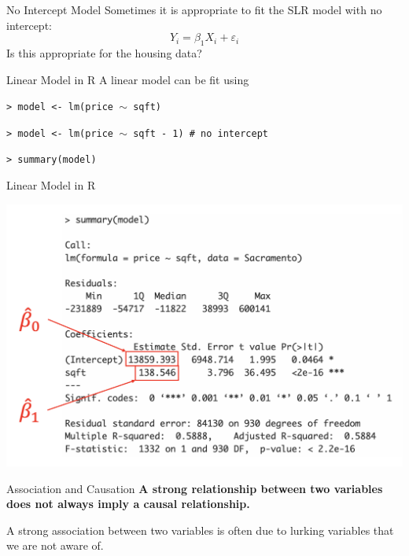 \documentclass[handout]{beamer}
\begin{document}
\begin{frame}{No Intercept Model}
    Sometimes it is appropriate to fit the SLR model with no intercept:
    \begin{equation*}
        Y_i = \beta_1 X_i + \varepsilon_i
    \end{equation*}
    Is this appropriate for the housing data?
\end{frame}

\begin{frame}{Linear Model in R}
    A linear model can be fit using
    \vspace*{0.5em}

    \footnotesize
    \texttt{> model <- lm(price $\sim$ sqft)} \par
    \texttt{> model <- lm(price $\sim$ sqft - 1) \# no intercept} \par
    \texttt{> summary(model)} \par 
\end{frame}

\begin{frame}{Linear Model in R}
    \begin{center}
        \includegraphics[width=.9\linewidth]{figures/summary_estimates.png}
    \end{center}
\end{frame}

\begin{frame}{Association and Causation}
    \textbf{A strong relationship between two variables does not always imply a causal relationship.}

    \vspace*{1em}
    A strong association between two variables is often due to lurking variables that we are not aware of. 
\end{frame}
\end{document}

